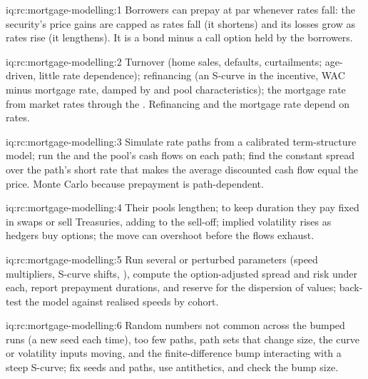 \begin{solution}{iq:rc:mortgage-modelling:1}
Borrowers can prepay at par whenever rates fall: the security's price gains are capped as
rates fall (it shortens) and its losses grow as rates rise (it lengthens). It is a bond
minus a call option held by the borrowers.
\end{solution}

\begin{solution}{iq:rc:mortgage-modelling:2}
Turnover (home sales, defaults, curtailments; age-driven, little rate dependence);
refinancing (an S-curve in the incentive, WAC minus mortgage rate, damped by 
and pool characteristics); the mortgage rate from market rates through the
. Refinancing and the mortgage rate depend on rates.
\end{solution}

\begin{solution}{iq:rc:mortgage-modelling:3}
Simulate rate paths from a calibrated term-structure model; run the  and
the pool's cash flows on each path; find the constant spread over the path's short rate
that makes the average discounted cash flow equal the price. Monte Carlo because
prepayment is path-dependent.
\end{solution}

\begin{solution}{iq:rc:mortgage-modelling:4}
Their pools lengthen; to keep duration they pay fixed in swaps or sell Treasuries, adding
to the sell-off; implied volatility rises as hedgers buy options; the move can overshoot
before the flows exhaust.
\end{solution}

\begin{solution}{iq:rc:mortgage-modelling:5}
Run several  or perturbed parameters (speed multipliers, S-curve shifts,
), compute the option-adjusted spread and risk under each, report prepayment
durations, and reserve for the dispersion of values; back-test the model against realised
speeds by cohort.
\end{solution}

\begin{solution}{iq:rc:mortgage-modelling:6}
Random numbers not common across the bumped runs (a new seed each time), too few paths,
path sets that change size, the curve or volatility inputs moving, and the finite-difference
bump interacting with a steep S-curve; fix seeds and paths, use antithetics, and check the
bump size.
\end{solution}
